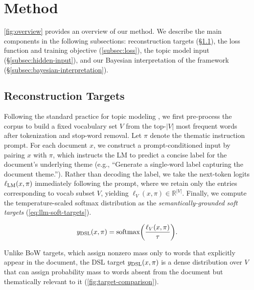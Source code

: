 \documentclass{article}
\theoremstyle{plain}
\theoremstyle{definition}
\theoremstyle{remark}
\begin{document}
\section{Method}
\label{sec:method}

\autoref{fig:overview} provides an overview of our method. We describe the main components in the following subsections: reconstruction targets (\S\ref{subsec:reconstruction-targets}), the loss function and training objective (\autoref{subsec:loss}), the topic model input (\S\ref{subsec:hidden-input}), and our Bayesian interpretation of the framework (\S\ref{subsec:bayesian-interpretation}).

\subsection{Reconstruction Targets}
\label{subsec:reconstruction-targets}
Following the standard practice for topic modeling \citep{hoyle2021automated}, we first pre-process the corpus to build a fixed vocabulary set $V$ from the top-$|V|$ most frequent words after tokenization and stop-word removal.
Let $\pi$ denote the thematic instruction prompt. For each document $x$, we construct a prompt-conditioned input by pairing $x$ with $\pi$, which instructs the LM to predict a concise label for the document's underlying theme (e.g., ``Generate a single-word label capturing the document theme.'').
Rather than decoding the label, we take the next-token logits $\ell_{\rm{LM}}(x, \pi)$ immediately following the prompt,  where we retain only the entries corresponding to vocab subset $V$, yielding $\ell_V(x, \pi) \in \mathbb{R}^{|V|}$. Finally, we compute the temperature-scaled softmax distribution as the \textit{semantically-grounded soft targets} (\autoref{eq:llm-soft-targets}).


\begin{equation}
y_{\rm{DSL}}(x, \pi)=\mathrm{softmax}\bigg(\frac{\ell_V(x, \pi)}{\tau}\bigg).
\label{eq:llm-soft-targets}
\end{equation}

Unlike BoW targets, which assign nonzero mass only to words that explicitly appear in the document, the DSL target $y_{\rm DSL}(x, \pi)$ is a dense distribution over $V$ that can assign probability mass to words absent from the document but
thematically relevant to it (\autoref{fig:target-comparison}).
\end{document}
